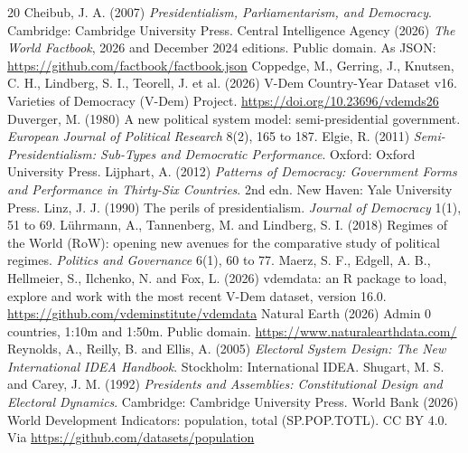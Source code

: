 \documentclass[11pt,a4paper]{article}
\begin{document}
\begin{thebibliography}{20}
 Cheibub, J. A. (2007) \emph{Presidentialism, Parliamentarism, and Democracy}. Cambridge: Cambridge University Press.
 Central Intelligence Agency (2026) \emph{The World Factbook}, 2026 and December 2024 editions. Public domain. As JSON: \url{https://github.com/factbook/factbook.json}
 Coppedge, M., Gerring, J., Knutsen, C. H., Lindberg, S. I., Teorell, J. et al. (2026) V-Dem Country-Year Dataset v16. Varieties of Democracy (V-Dem) Project. \url{https://doi.org/10.23696/vdemds26}
 Duverger, M. (1980) A new political system model: semi-presidential government. \emph{European Journal of Political Research} 8(2), 165 to 187.
 Elgie, R. (2011) \emph{Semi-Presidentialism: Sub-Types and Democratic Performance}. Oxford: Oxford University Press.
 Lijphart, A. (2012) \emph{Patterns of Democracy: Government Forms and Performance in Thirty-Six Countries}. 2nd edn. New Haven: Yale University Press.
 Linz, J. J. (1990) The perils of presidentialism. \emph{Journal of Democracy} 1(1), 51 to 69.
 Lührmann, A., Tannenberg, M. and Lindberg, S. I. (2018) Regimes of the World (RoW): opening new avenues for the comparative study of political regimes. \emph{Politics and Governance} 6(1), 60 to 77.
 Maerz, S. F., Edgell, A. B., Hellmeier, S., Ilchenko, N. and Fox, L. (2026) vdemdata: an R package to load, explore and work with the most recent V-Dem dataset, version 16.0. \url{https://github.com/vdeminstitute/vdemdata}
 Natural Earth (2026) Admin 0 countries, 1:10m and 1:50m. Public domain. \url{https://www.naturalearthdata.com/}
 Reynolds, A., Reilly, B. and Ellis, A. (2005) \emph{Electoral System Design: The New International IDEA Handbook}. Stockholm: International IDEA.
 Shugart, M. S. and Carey, J. M. (1992) \emph{Presidents and Assemblies: Constitutional Design and Electoral Dynamics}. Cambridge: Cambridge University Press.
 World Bank (2026) World Development Indicators: population, total (SP.POP.TOTL). CC BY 4.0. Via \url{https://github.com/datasets/population}
\end{thebibliography}
\end{document}

